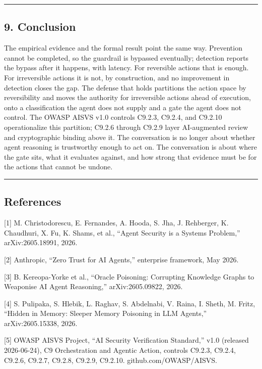 \documentclass[
  11pt,
]{article}
\begin{document}
\begin{center}\rule{0.5\linewidth}{0.5pt}\end{center}

\subsection{9. Conclusion}\label{conclusion}

The empirical evidence and the formal result point the same way.
Prevention cannot be completed, so the guardrail is bypassed eventually;
detection reports the bypass after it happens, with latency. For
reversible actions that is enough. For irreversible actions it is not,
by construction, and no improvement in detection closes the gap. The
defense that holds partitions the action space by reversibility and
moves the authority for irreversible actions ahead of execution, onto a
classification the agent does not supply and a gate the agent does not
control. The OWASP AISVS v1.0 controls C9.2.3, C9.2.4, and C9.2.10
operationalize this partition; C9.2.6 through C9.2.9 layer AI-augmented
review and cryptographic binding above it. The conversation is no longer
about whether agent reasoning is trustworthy enough to act on. The
conversation is about where the gate sits, what it evaluates against,
and how strong that evidence must be for the actions that cannot be
undone.

\begin{center}\rule{0.5\linewidth}{0.5pt}\end{center}

\subsection{References}\label{references}

{[}1{]} M. Christodorescu, E. Fernandes, A. Hooda, S. Jha, J. Rehberger,
K. Chaudhuri, X. Fu, K. Shams, et al., ``Agent Security is a Systems
Problem,'' arXiv:2605.18991, 2026.

{[}2{]} Anthropic, ``Zero Trust for AI Agents,'' enterprise framework,
May 2026.

{[}3{]} B. Kereopa-Yorke et al., ``Oracle Poisoning: Corrupting
Knowledge Graphs to Weaponise AI Agent Reasoning,'' arXiv:2605.09822,
2026.

{[}4{]} S. Pulipaka, S. Hlebik, L. Raghav, S. Abdelnabi, V. Raina, I.
Sheth, M. Fritz, ``Hidden in Memory: Sleeper Memory Poisoning in LLM
Agents,'' arXiv:2605.15338, 2026.

{[}5{]} OWASP AISVS Project, ``AI Security Verification Standard,'' v1.0
(released 2026-06-24), C9 Orchestration and Agentic Action, controls
C9.2.3, C9.2.4, C9.2.6, C9.2.7, C9.2.8, C9.2.9, C9.2.10.
github.com/OWASP/AISVS.
\end{document}
